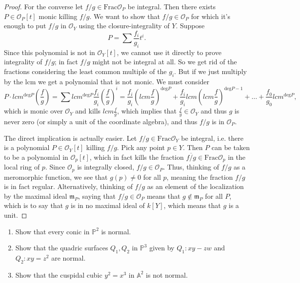 \begin{proof}
For the converse
let $f/g \in \text{Frac}\mathcal{O}_P$
be integral.
Then there exists $P \in \mathcal{O}_P[t]$
monic killing $f/g$.
We want to show that $f/g \in \mathcal{O}_P$
for which it's enough to put $f/g$ in
$\mathcal{O}_Y$ using the closure-integrality
of $Y$.
Suppose
$$
P=\sum \frac{f_i}{g_i}t^i.
$$
Since this polynomial is not in
$\mathcal{O}_Y[t]$, we cannot use it directly
to prove integrality of $f/g$;
in fact $f/g$ might not be integral at all.
So we get rid of the fractions
considering the least common multiple
of the $g_i$.
But if we just multiply by the lcm
we get a polynomial that is not monic.
We must consider
$$
P\cdot lcm^{\text{deg}P}
\left(\frac{f}{g}\right)
=\sum lcm^{\text{deg}P}\frac{f_i}{g_i}
\left(\frac{f}{g}\right)^i
=\frac{f_i}{g_i}
\left(lcm \frac{f}{g}\right)^{\text{deg}P}
+\frac{f_i}{g_i}lcm
\left(lcm\frac{f}{g}\right)^{\text{deg}P-1}
+…
+\frac{f_0}{g_0}lcm^{\text{deg}P},
$$
which is monic over $\mathcal{O}_Y$
and kills $lcm \frac{f}{g}$,
which implies that $\frac{f}{g}
\in \mathcal{O}_Y$
and thus $g$ is never zero
(or simply a unit of the coordinate algebra),
and thus $f/g$ is in $\mathcal{O}_P$.

The direct implication is actually easier.
Let $f/g \in \text{Frac}\mathcal{O}_Y$
be integral, i.e. there is a polynomial
$P \in \mathcal{O}_Y[t]$ killing $f/g$.
Pick any point $p \in Y$.
Then $P$ can be taken to be a polynomial
in $\mathcal{O}_p[t]$, which in fact
kills the fraction
$\overline{f/g} \in \text{Frac}\mathcal{O}_p$
in the local ring of $p$.
Since $\mathcal{O}_p$ is integrally closed,
$f/g \in \mathcal{O}_P$.
Thus, thinking of $f/g$ as a meromorphic
function, we see that $g(p) \neq  0$ for all $p$,
meaning the fraction $f/g$ is in fact
regular. Alternatively, thinking of $f/g$
as an element of the localization by the
maximal ideal $\mathfrak{m}_P$,
saying that $f/g \in \mathcal{O}_P$
means that $g \not\in \mathfrak{m}_P$
for all $P$, which is to say that $g$
is in no maximal ideal of $k[Y]$,
which means that $g$ is a unit.
\end{proof}

\begin{exercise}
\label{exercise-normal-varieties-examples}
\begin{enumerate}
\item Show that every conic in $\mathbb{P}^2$
is normal.
\item Show that the quadric surfaces
$Q_1,Q_2$ in $\mathbb{P}^3$ given by
$Q_1:xy-zw$ and $Q_2:xy=z^2$ are normal.
\item Show that the cuspidal cubic
$y^2=x^3$ in $\mathbb{A}^2$
is not normal.
\end{enumerate}
\end{exercise}

